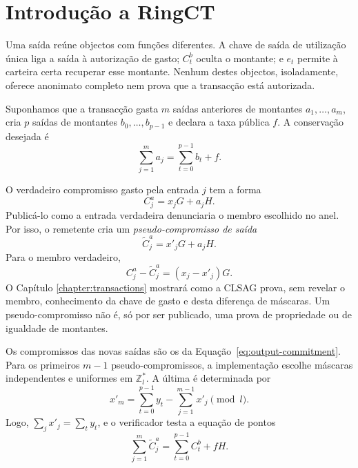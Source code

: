 \section{Introdução a RingCT}
\label{sec:ringct-introduction}

Uma saída reúne objectos com funções diferentes. A chave de saída de
utilização única liga a saída à autorização de gasto; \(C_t^b\) oculta o
montante; e \(e_t\) permite à carteira certa recuperar esse montante. Nenhum
destes objectos, isoladamente, oferece anonimato completo nem prova que a
transacção está autorizada.

Suponhamos que a transacção gasta \(m\) saídas anteriores de montantes
\(a_1,\ldots,a_m\), cria \(p\) saídas de montantes
\(b_0,\ldots,b_{p-1}\) e declara a taxa pública \(f\). A conservação desejada
é
\begin{equation}
 \sum_{j=1}^{m}a_j=\sum_{t=0}^{p-1}b_t+f.
 \label{eq:amount-balance}
\end{equation}

O verdadeiro compromisso gasto pela entrada \(j\) tem a forma
\[
 C_j^a=x_jG+a_jH.
\]
Publicá-lo como a entrada verdadeira denunciaria o membro escolhido no anel.
Por isso, o remetente cria um \emph{pseudo-compromisso de saída}
\[
 \widetilde C_j^a=x'_jG+a_jH.
\]
Para o membro verdadeiro,
\begin{equation}
 C_j^a-\widetilde C_j^a=(x_j-x'_j)G.
 \label{eq:pseudo-output-difference}
\end{equation}
O Capítulo \ref{chapter:transactions} mostrará como a CLSAG prova, sem revelar
o membro, conhecimento da chave de gasto e desta diferença de máscaras. Um
pseudo-compromisso não é, só por ser publicado, uma prova de propriedade ou
de igualdade de montantes.

%
Os compromissos das novas saídas são os da
Equação~\eqref{eq:output-commitment}. Para os primeiros \(m-1\)
pseudo-compromissos, a implementação escolhe máscaras independentes e
uniformes em \(\mathbb Z_l^*\). A última é determinada por
\begin{equation}
 x'_m=\sum_{t=0}^{p-1}y_t-
       \sum_{j=1}^{m-1}x'_j\pmod l.
 \label{eq:last-pseudo-mask}
\end{equation}
Logo, \(\sum_jx'_j=\sum_ty_t\), e o verificador testa a equação de pontos
\begin{equation}
 \boxed{\displaystyle
 \sum_{j=1}^{m}\widetilde C_j^a
   =\sum_{t=0}^{p-1}C_t^b+fH.}
 \label{eq:commitment-balance}
\end{equation}


